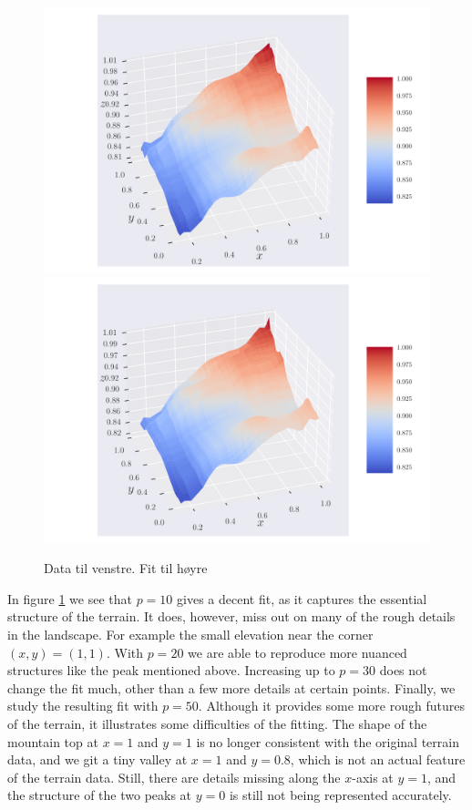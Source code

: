 \documentclass[reprint,english,notitlepage,aps,nobalancelastpage,nofootinbib]{revtex4-1}  %
\begin{document}
\begin{figure}[h]
	\includegraphics[width=\linewidth]{SRTM_prediction_p30.pdf}
	\endminipage\hfill
	\includegraphics[width=\linewidth]{SRTM_prediction_p50.pdf}
	\endminipage
	\caption{Data til venstre. Fit til høyre}
  \label{fig:terrain_fit}
\end{figure}

In figure \ref{fig:terrain_fit} we see that $p=10$ gives a decent fit, as it captures the essential structure of the terrain. It does, however, miss out on many of the rough details in the landscape. For example the small elevation near the corner $(x,y) = (1,1)$. With $p=20$ we are able to reproduce more nuanced structures like the peak mentioned above. Increasing up to $p=30$ does not change the fit much, other than a few more details at certain points. Finally, we study the resulting fit with $p=50$. Although it provides some more rough futures of the terrain, it illustrates some difficulties of the fitting. The shape of the mountain top at $x=1$ and $y=1$ is no longer consistent with the original terrain data, and we git a tiny valley at $x=1$ and $y=0.8$, which is not an actual feature of the terrain data. Still, there are details missing along the $x$-axis at $y=1$, and the structure of the two peaks at $y=0$ is still not being represented accurately.
\end{document}
